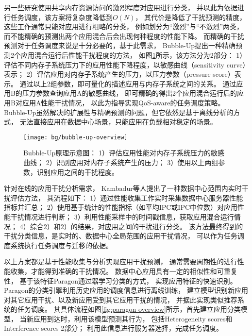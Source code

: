 另一些研究使用共享内存资源访问的激烈程度对应用进行分类，
并以此为依据进行任务调度\cite{}，该方案将复杂度降低到$O(N)$，
其代价是降低了干扰预测的精度，这些工作通常只能对应用进行粗略的分类，
例如划分为``激烈''与``不激烈''两类，
而不能精确的预测出两个应用混合后会出现何种程度的性能下降。
而精确的干扰预测对于任务调度来说是十分必要的，基于此需求，
Bubble-Up\cite{mars_bubble-up:_2011}提出一种精确预测2个应用混合运行后性能干扰程度的方法，
如图\ref{fig:bubble-up-overview}所示，该方法分为2部分：
1）评估不同内存子系统压力下的应用性能下降程度，以敏感曲线（sensitivity curve）表示；
2）评估应用对内存子系统产生的压力，以压力参数（pressure score）表示。
通过以上2组参数，即可量化的描述应用与内存子系统之间的关系。
通过应用B的压力参数查询应用A的敏感曲线，
即可精确的得出2个应用混合运行后的应用B对应用A性能干扰情况，
以此为指导实现QoS-aware的任务调度策略。
Bubble-Up虽然解决的扩展性与精确预测的问题，但它依然是基于离线分析的方式，
无法直接应用在数据中心场景，只能应用在负载相对稳定的场景。

\begin{figure}[tb]
  \centering
  \texttt{[image: bg/bubble-up-overview]}
  \caption[BubbleUp\cite{mars_bubble-up:_2011}原理示意图]{
    Bubble-Up\cite{mars_bubble-up:_2011}原理示意图：
    1）评估应用性能对内存子系统压力的敏感曲线；
    2）识别应用对内存子系统产生的压力；
    3）使用以上两组参数，识别应用之间的干扰程度。}
  \label{fig:bubble-up-overview}
\end{figure}

针对在线的应用干扰分析需求，
Kambadur等人提出了一种数据中心范围内实时干扰评估方法\cite{kambadur_measuring_2012}，
其流程如下：
1）通过性能收集工作实时采集数据中心服务器性能指标并汇总；
2）使用基于统计的性能指标（如平均IPC或IPC中位数）对应用性能干扰情况进行判断；
3）利用性能采样中的时间戳信息，获取应用混合运行情况；
4）综合2）和2）的结果，对应用之间的干扰进行分类。
该方法最终得到的干扰分类信息，是实时的、数据中心全局范围的应用干扰情况，
可以作为任务调度系统执行任务调度与迁移的依据。

以上方案都是基于性能收集与分析实现应用干扰预测，
通常需要周期性的进行性能收集，才能得到准确的干扰情况。
数据中心应用具有一定的相似性和可重复性，
基于该特征Paragon\cite{delimitrou_paragon:_2013}通过器学习分类的方式，
实现应用特征的快速识别。
Paragon的分类引擎利用历史应用的调度信息进行离线训练，
建立模型识别新应用对其它应用干扰、以及新应用受到其它应用干扰的情况，
并据此实现类似推荐系统的任务调度。
其具体流程如图\ref{fig:paragon-overview}所示，首先建立应用分类模型，
当新应用到达时，利用该模型预测其行为，
包括Heterogeneity scores和Interference scores 2部分；
利用此信息进行服务器选择，完成任务调度。

